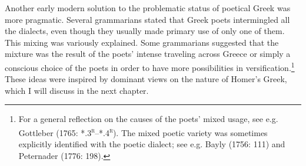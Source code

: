 \begin{styleStandard}
Another early modern solution to the problematic status of poetical Greek was more pragmatic. Several grammarians stated that Greek poets intermingled all the dialects, even though they usually made primary use of only one of them. This mixing was variously explained. Some grammarians suggested that the mixture was the result of the poets’ intense traveling across Greece or simply a conscious choice of the poets in order to have more possibilities in versification.\footnote{ For a general reflection on the causes of the poets’ mixed usage, see e.g. Gottleber (1765: *.3\textsc{\textsuperscript{r}}–*.4\textsc{\textsuperscript{r}}). The mixed poetic variety was sometimes explicitly identified with the poetic dialect; see e.g. Bayly (1756: 111) and Peternader (1776: 198).} These ideas were inspired by dominant views on the nature of Homer’s Greek, which I will discuss in the next chapter.
\end{styleStandard}

